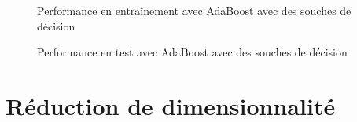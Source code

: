 \documentclass[french, twoside=semi, headings=normal]{scrartcl}
\begin{document}
\begin{figure}
	\centering
	
	\caption{Performance en entraînement avec AdaBoost avec des souches de décision}
	\label{fig:adaboost_train_scores_with_decision_stumps}
\end{figure}

\begin{figure}
	\centering
	
	\caption{Performance en test avec AdaBoost avec des souches de décision}
	\label{fig:adaboost_test_scores_with_decision_stumps}
\end{figure}


\section{Réduction de dimensionnalité}
\end{document}

